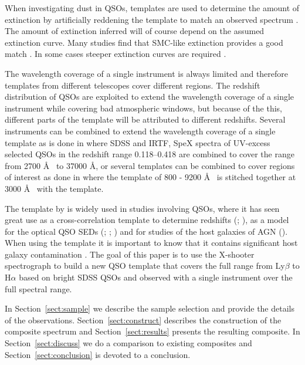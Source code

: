 \documentclass{aa}    %
\newcommand{\sectionname}{Section}
\newcommand{\Sect}[1]{\sectionname~\ref{sect:#1}}
\newcommand{\sect}[1]{\Sect{#1}}
\begin{document}
When investigating dust in QSOs, templates are used to determine the
amount of extinction by artificially reddening the template 
to match an observed spectrum 
\citep[e.g.,][]{Glikman2007,Urrutia2009,Wang2012,Fynbo2013,Krogager2015}. 
The amount of extinction inferred will of course depend on the
assumed extinction curve. Many studies find that SMC-like extinction provides
a good match \citep{Richards2003,Hopkins2004}. In some cases steeper extinction
curves are required \citep{Fynbo2013,Jiang2013,Leighly2014}.

The wavelength coverage of a single instrument is always limited and therefore
templates from different telescopes cover different regions. The redshift
distribution of QSOs are exploited to extend the wavelength coverage of a
single instrument while covering bad atmospheric windows, but because of the
this, different parts of the template will be attributed to different
redshifts. Several instruments can be combined to extend the wavelength
coverage of a single template as is done in \citep{Glikman2006} where SDSS
\citep{Gunn2006} and IRTF, SpeX \citep{Rayner2003} spectra of UV-excess selected
QSOs in the redshift range 0.118--0.418 are combined to
cover the range from 2700 \AA~ to 37000 \AA, or several templates can be
combined to cover regions of interest as done in \citep{Zhou2010} where the
template of \citep{VandenBerk2001} 800 - 9200 \AA~ is stitched together at 3000
\AA~ with the \citep{Glikman2006} template. 

The template by \cite{VandenBerk2001} is widely
used in studies involving QSOs, where it has seen great use as a
cross-correlation template to determine redshifts (\cite{Stoughton2002};
\cite{Rafiee2011}), as a model for the optical QSO SEDs (\cite{Croom2004};
\cite{Hopkins2006}; \cite{Hopkins2007}) and for studies of the host galaxies of
AGN (\cite{Kauffmann2003b}). When using the \citet{VandenBerk2001} template
it is important to know that it contains significant host galaxy contamination
\citep[e.g.,][their Fig.~5]{Fynbo2013}. The 
goal of this paper is to use the X-shooter spectrograph to build a new 
QSO template that covers the full range from Ly$\beta$ to H$\alpha$ based on bright
SDSS QSOs and observed with a single instrument over the full spectral range.

In \sect{sample} we describe the sample selection and provide the details 
of the observations.
\sect{construct} describes the construction of the composite spectrum
and \sect{results} presents the resulting composite. In \sect{discuss} we do a
comparison to existing composites and \sect{conclusion} is devoted to a
conclusion.
\end{document}
